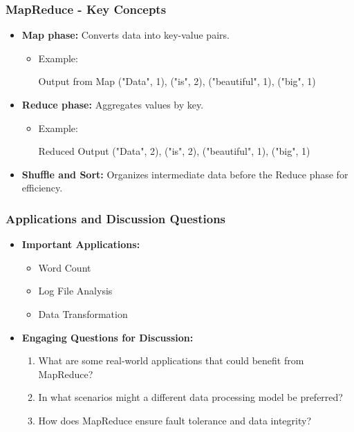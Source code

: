 \documentclass[aspectratio=169]{beamer}
\begin{document}
\begin{frame}[fragile]
    \frametitle{MapReduce - Key Concepts}
    \begin{itemize}
        \item \textbf{Map phase:} Converts data into key-value pairs.
        \begin{itemize}
            \item Example: 
            \begin{block}{Output from Map}
                ("Data", 1), ("is", 2), ("beautiful", 1), ("big", 1)
            \end{block}
        \end{itemize}
        
        \item \textbf{Reduce phase:} Aggregates values by key.
        \begin{itemize}
            \item Example: 
            \begin{block}{Reduced Output}
                ("Data", 2), ("is", 2), ("beautiful", 1), ("big", 1)
            \end{block}
        \end{itemize}
        
        \item \textbf{Shuffle and Sort:} Organizes intermediate data before the Reduce phase for efficiency.
    \end{itemize}
\end{frame}

\begin{frame}[fragile]
    \frametitle{Applications and Discussion Questions}
    \begin{itemize}
        \item \textbf{Important Applications:}
        \begin{itemize}
            \item Word Count
            \item Log File Analysis
            \item Data Transformation
        \end{itemize}
        
        \item \textbf{Engaging Questions for Discussion:}
        \begin{enumerate}
            \item What are some real-world applications that could benefit from MapReduce?
            \item In what scenarios might a different data processing model be preferred?
            \item How does MapReduce ensure fault tolerance and data integrity?
        \end{enumerate}
    \end{itemize}
\end{frame}
\end{document}
